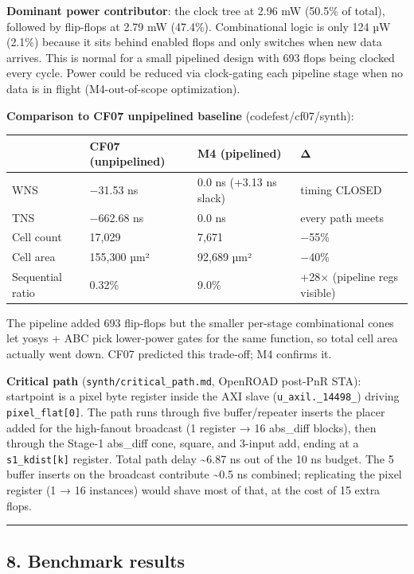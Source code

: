 \documentclass[
  10pt,
]{article}
\begin{document}
\textbf{Dominant power contributor}: the clock tree at 2.96 mW (50.5\%
of total), followed by flip-flops at 2.79 mW (47.4\%). Combinational
logic is only 124 µW (2.1\%) because it sits behind enabled flops and
only switches when new data arrives. This is normal for a small
pipelined design with 693 flops being clocked every cycle. Power could
be reduced via clock-gating each pipeline stage when no data is in
flight (M4-out-of-scope optimization).

\textbf{Comparison to CF07 unpipelined baseline} (codefest/cf07/synth):

\begin{longtable}[]{@{}llll@{}}
\toprule\noalign{}
& CF07 (unpipelined) & M4 (pipelined) & Δ \\
\midrule\noalign{}
\endhead
\bottomrule\noalign{}
\endlastfoot
WNS & −31.53 ns & 0.0 ns (+3.13 ns slack) & timing CLOSED \\
TNS & −662.68 ns & 0.0 ns & every path meets \\
Cell count & 17,029 & 7,671 & −55\% \\
Cell area & 155,300 µm² & 92,689 µm² & −40\% \\
Sequential ratio & 0.32\% & 9.0\% & +28× (pipeline regs visible) \\
\end{longtable}

The pipeline added 693 flip-flops but the smaller per-stage
combinational cones let yosys + ABC pick lower-power gates for the same
function, so total cell area actually went down. CF07 predicted this
trade-off; M4 confirms it.

\textbf{Critical path} (\texttt{synth/critical\_path.md}, OpenROAD
post-PnR STA): startpoint is a pixel byte register inside the AXI slave
(\texttt{u\_axil.\_14498\_}) driving \texttt{pixel\_flat{[}0{]}}. The
path runs through five buffer/repeater inserts the placer added for the
high-fanout broadcast (1 register → 16 abs\_diff blocks), then through
the Stage-1 abs\_diff cone, square, and 3-input add, ending at a
\texttt{s1\_kdist{[}k{]}} register. Total path delay \textasciitilde6.87
ns out of the 10 ns budget. The 5 buffer inserts on the broadcast
contribute \textasciitilde0.5 ns combined; replicating the pixel
register (1 → 16 instances) would shave most of that, at the cost of 15
extra flops.

\begin{center}\rule{0.5\linewidth}{0.5pt}\end{center}

\hypertarget{benchmark-results}{%
\subsection{8. Benchmark results}\label{benchmark-results}}
\end{document}
